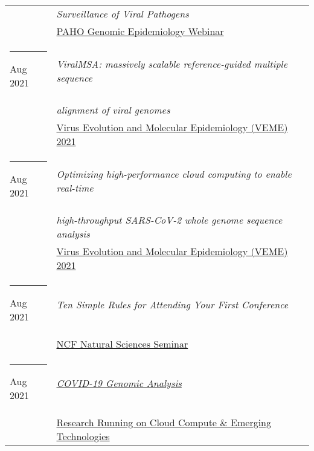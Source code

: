 \documentclass[margin,line]{res}
\begin{document}
\begin{resume}
\begin{longtable}{@{}p{0.7in}p{4in}}
\hspace*{-4mm} & \hspace{4mm} \textit{Surveillance of Viral Pathogens}\\*
\hspace*{-4mm} & \hspace{4mm} \href{https://www.paho.org/}{PAHO Genomic Epidemiology Webinar}\\
\hspace*{-4mm} \rule{-1mm}{5mm} Aug 2021 & \textit{ViralMSA: massively scalable reference-guided multiple sequence}\\*
\hspace*{-4mm} & \hspace{4mm} \textit{alignment of viral genomes}\\*
\hspace*{-4mm} & \hspace{4mm} \href{https://rega.kuleuven.be/cev/veme-workshop/2021}{Virus Evolution and Molecular Epidemiology (VEME) 2021}\\
\hspace*{-4mm} \rule{-1mm}{5mm} Aug 2021 & \textit{Optimizing high-performance cloud computing to enable real-time}\\*
\hspace*{-4mm} & \hspace{4mm} \textit{high-throughput SARS-CoV-2 whole genome sequence analysis}\\*
\hspace*{-4mm} & \hspace{4mm} \href{https://rega.kuleuven.be/cev/veme-workshop/2021}{Virus Evolution and Molecular Epidemiology (VEME) 2021}\\
\hspace*{-4mm} \rule{-1mm}{5mm} Aug 2021 & \textit{Ten Simple Rules for Attending Your First Conference}\\*
\hspace*{-4mm} & \hspace{4mm} \href{https://www.ncf.edu/academics/undergraduate-program/division-of-natural-sciences/natural-sciences/}{NCF Natural Sciences Seminar}\\
\hspace*{-4mm} \rule{-1mm}{5mm} Aug 2021 & \href{https://na.eventscloud.com/website/23042/}{\textit{COVID-19 Genomic Analysis}}\\*
\hspace*{-4mm} & \hspace{4mm} \href{https://na.eventscloud.com/website/23042/}{Research Running on Cloud Compute \& Emerging Technologies}\\*

\end{longtable}
\end{resume}
\end{document}
